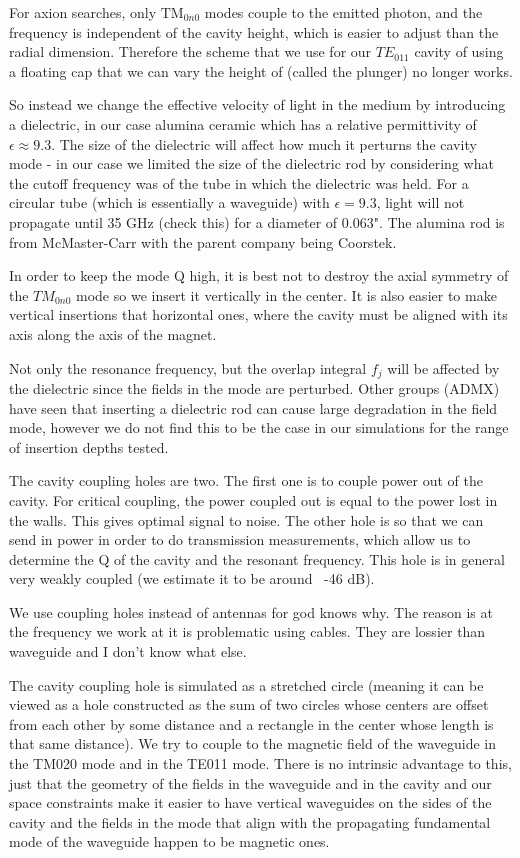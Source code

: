 \documentclass[11pt]{article}
\begin{document}
For axion searches, only $\text{TM}_{0n0}$ modes couple to the emitted photon, and the frequency is independent of the cavity height, which is easier to adjust than the radial dimension. Therefore the scheme that we use for our $TE_{011}$ cavity of using a floating cap that we can vary the height of (called the plunger) no longer works.  

So instead we change the effective velocity of light in the medium by introducing a dielectric, in our case alumina ceramic which has a relative permittivity of $\epsilon \approx 9.3$. The size of the dielectric will affect how much it perturns the cavity mode - in our case we limited the size of the dielectric rod by considering what the cutoff frequency was of the tube in which the dielectric was held. For a circular tube (which is essentially a waveguide) with $\epsilon = 9.3$, light will not propagate until 35 GHz (check this) for a diameter of 0.063". The alumina rod is from McMaster-Carr with the parent company being Coorstek. 

In order to keep the mode Q high, it is best not to destroy the axial symmetry of the $TM_{0n0}$ mode so we insert it vertically in the center. It is also easier to make vertical insertions that horizontal ones, where the cavity must be aligned with its axis along the axis of the magnet. 

Not only the resonance frequency, but the overlap integral $f_j$ will be affected by the dielectric since the fields in the mode are perturbed. Other groups (ADMX) have seen that inserting a dielectric rod can cause large degradation in the field mode, however we do not find this to be the case in our simulations for the range of insertion depths tested.

The cavity coupling holes are two. The first one is to couple power out of the cavity. For critical coupling, the power coupled out is equal to the power lost in the walls. This gives optimal signal to noise. The other hole is so that we can send in power in order to do transmission measurements, which allow us to determine the Q of the cavity and the resonant frequency. This hole is in general very weakly coupled (we estimate it to be around ~-46 dB). 

We use coupling holes instead of antennas for god knows why. The reason is at the frequency we work at it is problematic using cables. They are lossier than waveguide and I don't know what else.

The cavity coupling hole is simulated as a stretched circle (meaning it can be viewed as a hole constructed as the sum of two circles whose centers are offset from each other by some distance and a rectangle in the center whose length is that same distance). We try to couple to the magnetic field of the waveguide in the TM020 mode and in the TE011 mode. There is no intrinsic advantage to this, just that the geometry of the fields in the waveguide and in the cavity and our space constraints make it easier to have vertical waveguides on the sides of the cavity and the fields in the mode that align with the propagating fundamental mode of the waveguide happen to be magnetic ones.
\end{document}
